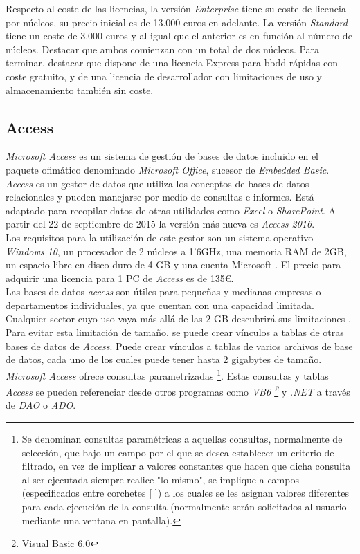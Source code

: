 \documentclass[10pt]{article}
\begin{document}
Respecto al coste de las licencias, la versión \emph{Enterprise} tiene su coste de licencia por núcleos, su precio inicial es de 13.000 euros en adelante. La versión \emph{Standard} tiene un coste de 3.000 euros y al igual que el anterior es en función al número de núcleos. Destacar que ambos comienzan con un total de dos núcleos. Para terminar, destacar que dispone de una licencia Express para bbdd rápidas con coste gratuito, y de una licencia de desarrollador con limitaciones de uso y almacenamiento también sin coste.\\

\subsection{Access}
\emph{Microsoft Access} es un sistema de gestión de bases de datos incluido en el paquete ofimático denominado \emph{Microsoft Office}, sucesor de \emph{Embedded Basic}. \emph{Access} es un gestor de datos que utiliza los conceptos de bases de datos relacionales y pueden manejarse por medio de consultas e informes. Está adaptado para recopilar datos de otras utilidades como \emph{Excel} o \emph{SharePoint}. A partir del 22 de septiembre de 2015 la versión más nueva es \emph{Access 2016}. \cite{ACC:1} \\

Los requisitos para la utilización de este gestor son un sistema operativo \emph{Windows 10}, un procesador de 2 núcleos a 1'6GHz, una memoria RAM de 2GB, un espacio libre en disco duro de 4 GB y una cuenta Microsoft \cite{ACC:2}. El precio para adquirir una licencia para 1 PC de \emph{Access} es de 135\euro. \cite{ACC:3} \\

Las bases de datos \emph{access} son útiles para pequeñas y medianas empresas o departamentos individuales, ya que cuentan con una capacidad limitada. Cualquier sector cuyo uso vaya más allá de las 2 GB descubrirá sus limitaciones \cite{ACC:4}. Para evitar esta limitación de tamaño, se puede crear vínculos a tablas de otras bases de datos de \emph{Access}. Puede crear vínculos a tablas de varios archivos de base de datos, cada uno de los cuales puede tener hasta 2 gigabytes de tamaño. \cite{ACC:5}\\

\emph{Microsoft Access} ofrece consultas parametrizadas \footnote{Se denominan consultas paramétricas a aquellas consultas, normalmente de selección, que bajo un campo por el que se desea establecer un criterio de filtrado, en vez de implicar a valores constantes que hacen que dicha consulta al ser ejecutada siempre realice "lo mismo", se implique a campos (especificados entre corchetes [ ]) a los cuales se les asignan valores diferentes para cada ejecución de la consulta (normalmente serán solicitados al usuario mediante una ventana en pantalla).\cite{ACC:7}}. Estas consultas y tablas \emph{Access} se pueden referenciar desde otros programas como \emph{VB6 \footnote{Visual Basic 6.0}} y \emph{.NET} a través de \emph{DAO} o \emph{ADO}. \cite{ACC:6}\\
\end{document}
